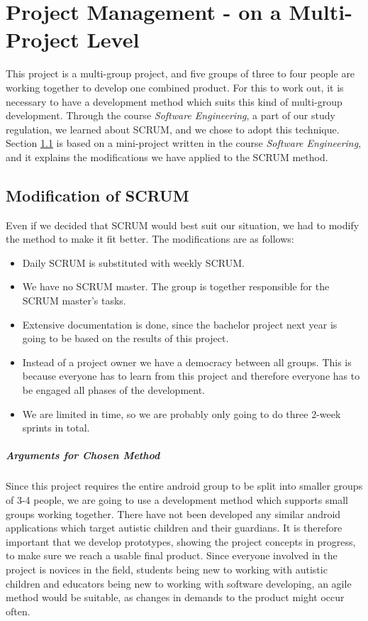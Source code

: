 \chapter{Project Management - on a Multi-Project Level}
	\label{cha:project_management}

This project is a multi-group project, and five groups of three to four people are working together to develop one combined product. For this to work out, it is necessary to have a development method which suits this kind of multi-group development. Through the course \textit{Software Engineering}, a part of our study regulation, we learned about SCRUM, and we chose to adopt this technique.\\
Section \ref{sec:mod_of_scrum} is based on a mini-project written in the course \textit{Software Engineering}, and it explains the modifications we have applied to the SCRUM method.

\section{Modification of SCRUM}
	\label{sec:mod_of_scrum}
Even if we decided that SCRUM would best suit our situation, we had to modify the method to make it fit better. The modifications are as follows:
	\begin{itemize}
		\item Daily SCRUM is substituted with weekly SCRUM.
		\item We have no SCRUM master. The group is together responsible for the SCRUM master's tasks.
		\item Extensive documentation is done, since the bachelor project next year is going to be based on the results of this project.
		\item Instead of a project owner we have a democracy between all groups. This is because everyone has to learn from this project and therefore everyone has to be engaged all phases of the development.
		\item We are limited in time, so we are probably only going to do three 2-week sprints in total.
	\end{itemize}

\paragraph{Arguments for Chosen Method}
Since this project requires the entire android group to be split into smaller groups of 3-4 people, we are going to use a development method which supports small groups working together.
   There have not been developed any similar android applications which target autistic children and their guardians. It is therefore important that we develop prototypes, showing the project concepts in progress, to make sure we reach a usable final product.
   Since everyone involved in the project is novices in the field, students being new to working with autistic children and educators being new to working with software developing, an agile method would be suitable, as changes in demands to the product might occur often.\\

